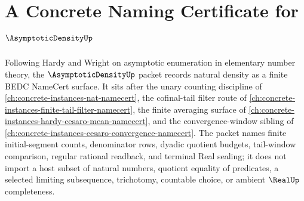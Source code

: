 \chapter{A Concrete Naming Certificate for $\AsymptoticDensityUp$}
\label{ch:concrete-instances-asymptotic-density-namecert}

Following Hardy and Wright on asymptotic enumeration in elementary number theory, the $\AsymptoticDensityUp$ packet records natural density as a finite BEDC NameCert surface. It sits after the unary counting discipline of \autoref{ch:concrete-instances-nat-namecert}, the cofinal-tail filter route of \autoref{ch:concrete-instances-finite-tail-filter-namecert}, the finite averaging surface of \autoref{ch:concrete-instances-hardy-cesaro-mean-namecert}, and the convergence-window sibling of \autoref{ch:concrete-instances-cesaro-convergence-namecert}. The packet names finite initial-segment counts, denominator rows, dyadic quotient budgets, tail-window comparison, regular rational readback, and terminal Real sealing; it does not import a host subset of natural numbers, quotient equality of predicates, a selected limiting subsequence, trichotomy, countable choice, or ambient $\RealUp$ completeness.


